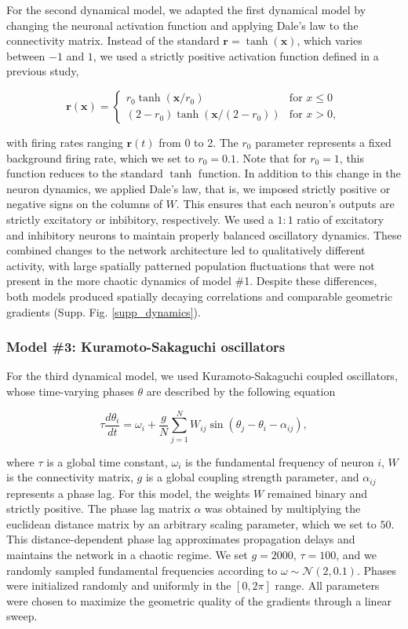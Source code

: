 \documentclass{article}
\begin{document}
For the second dynamical model, we adapted the first dynamical model by changing the neuronal activation function and applying Dale's law to the connectivity matrix. Instead of the standard $\textbf{r}=\tanh(\textbf{x})$, which varies between $-1$ and $1$, we used a strictly positive activation function defined in a previous study,

$$
\textbf{r}(\textbf{x})=
\begin{cases}
r_0\tanh(\textbf{x}/r_0) & \text{for } x\leq0\\
(2-r_0)\tanh(\textbf{x}/(2-r_0)) & \text{for } x>0,
\end{cases}
$$

with firing rates ranging $\textbf{r}(t)$ from 0 to 2. The $r_0$ parameter represents a fixed background firing rate, which we set to $r_0=0.1$. Note that for $r_0=1$, this function reduces to the standard $\tanh$ function. In addition to this change in the neuron dynamics, we applied Dale's law, that is, we imposed strictly positive or negative signs on the columns of $W$. This ensures that each neuron's outputs are strictly excitatory or inbibitory, respectively. We used a $1:1$ ratio of excitatory and inhibitory neurons to maintain properly balanced oscillatory dynamics. These combined changes to the network architecture led to qualitatively different activity, with large spatially patterned population fluctuations that were not present in the more chaotic dynamics of model \#1. Despite these differences, both models produced spatially decaying correlations and comparable geometric gradients (Supp. Fig. \ref{supp_dynamics}).

\subsubsection*{Model \#3: Kuramoto-Sakaguchi oscillators}

For the third dynamical model, we used Kuramoto-Sakaguchi coupled oscillators, whose time-varying phases $\theta$ are described by the following equation

$$\tau\frac{d\theta_i}{dt}=\omega_i+ \frac{g}{N}\sum_{j=1}^N W_{ij}\sin(\theta_j - \theta_i - \alpha_{ij}),$$

where $\tau$ is a global time constant, $\omega_i$ is the fundamental frequency of neuron $i$, $W$ is the connectivity matrix, $g$ is a global coupling strength parameter, and $\alpha_{ij}$ represents a phase lag. For this model, the weights $W$ remained binary and strictly positive. The phase lag matrix $\alpha$ was obtained by multiplying the euclidean distance matrix by an arbitrary scaling parameter, which we set to $50$. This distance-dependent phase lag approximates propagation delays and maintains the network in a chaotic regime. We set $g=2000$, $\tau=100$, and we randomly sampled fundamental frequencies according to $\omega \sim \mathcal{N}(2, 0.1)$. Phases were initialized randomly and uniformly in the $[0, 2\pi]$ range. All parameters were chosen to maximize the geometric quality of the gradients through a linear sweep.
\end{document}
